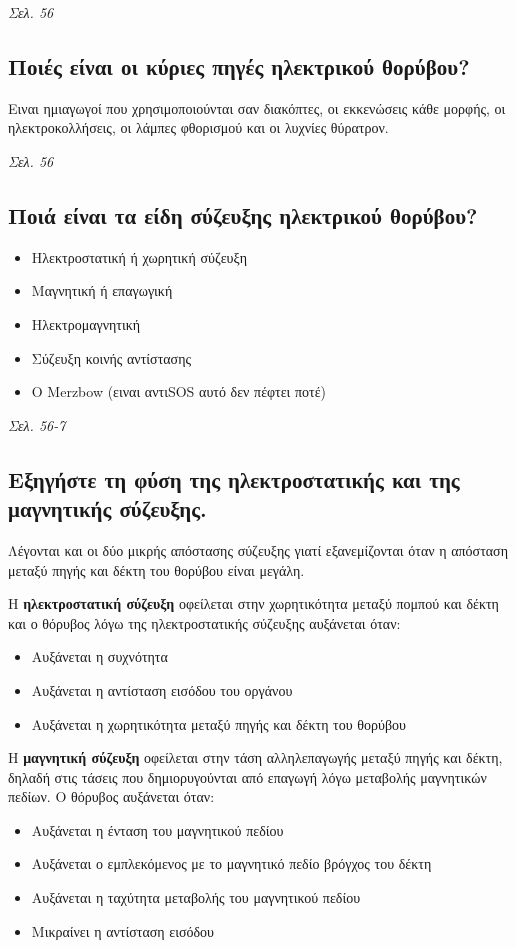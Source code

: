 \documentclass{article}
\begin{document}
\emph{Σελ. 56}

\subsection{Ποιές είναι οι κύριες πηγές ηλεκτρικού θορύβου?}
Ειναι ημιαγωγοί που χρησιμοποιούνται σαν διακόπτες, οι εκκενώσεις κάθε μορφής, οι ηλεκτροκολλήσεις, οι λάμπες φθορισμού και οι λυχνίες θύρατρον.

\emph{Σελ. 56}

\subsection{Ποιά είναι τα είδη σύζευξης ηλεκτρικού θορύβου?}
\begin{itemize}
    \item Ηλεκτροστατική ή χωρητική σύζευξη
    \item Μαγνητική ή επαγωγική
    \item Ηλεκτρομαγνητική
    \item Σύζευξη κοινής αντίστασης
    \item O \foreignlanguage{english}{Merzbow} (ειναι αντι\foreignlanguage{english}{SOS} αυτό δεν πέφτει ποτέ)
\end{itemize}

\emph{Σελ. 56-7}
\subsection{Εξηγήστε τη φύση της ηλεκτροστατικής και της μαγνητικής \linebreak σύζευξης.}
Λέγονται και οι δύο μικρής απόστασης σύζευξης γιατί εξανεμίζονται όταν η απόσταση μεταξύ πηγής και δέκτη του θορύβου είναι μεγάλη.

Η \textbf{ηλεκτροστατική σύζευξη} οφείλεται στην χωρητικότητα μεταξύ πομπού και δέκτη και ο θόρυβος λόγω της ηλεκτροστατικής σύζευξης αυξάνεται όταν:
\begin{itemize}
    \item Αυξάνεται η συχνότητα
    \item Aυξάνεται η αντίσταση εισόδου του οργάνου
    \item Αυξάνεται η χωρητικότητα μεταξύ πηγής και δέκτη του θορύβου
\end{itemize}

Η \textbf{μαγνητική σύζευξη} οφείλεται στην τάση αλληλεπαγωγής μεταξύ πηγής και δέκτη, δηλαδή στις τάσεις που δημιορυγούνται από επαγωγή λόγω μεταβολής μαγνητικών πεδίων. Ο θόρυβος αυξάνεται όταν:
\begin{itemize}
    \item Aυξάνεται η ένταση του μαγνητικού πεδίου
    \item Αυξάνεται ο εμπλεκόμενος με το μαγνητικό πεδίο βρόγχος του δέκτη
    \item Αυξάνεται η ταχύτητα μεταβολής του μαγνητικού πεδίου
    \item Μικραίνει η αντίσταση εισόδου
\end{itemize}
\end{document}
